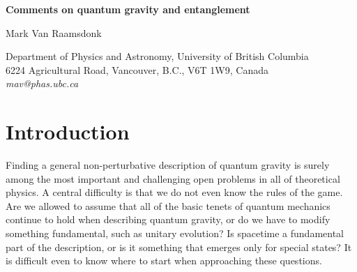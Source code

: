 \documentclass[12pt,epsf]{article}
\renewcommand{\(}{\left(}
\renewcommand{\)}{\right)}
\begin{document}
\begin{titlepage}
\hfill

\vspace*{20mm}
\begin{center}
{\Large \bf Comments on quantum gravity and entanglement}

\vspace*{15mm}
\vspace*{1mm}

Mark Van Raamsdonk

\vspace*{1cm}

{Department of Physics and Astronomy,
University of British Columbia\\
6224 Agricultural Road,
Vancouver, B.C., V6T 1W9, Canada\\
{\it mav@phas.ubc.ca}
}

\vspace*{1cm}
\end{center}

\begin{abstract}
In this note, we attempt to provide some insights into the structure of non-perturbative descriptions of quantum gravity using known examples of gauge-theory / gravity duality. We argue that in familiar examples, a quantum description of spacetime can be associated with a manifold-like structure in which particular patches of spacetime are associated with states or density matrices in specific quantum systems. We argue that quantum entanglement between microscopic degrees of freedom plays an essential role in the emergence of a dual spacetime from the nonperturbative degrees of freedom. In particular, in at least some cases, classically connected spacetimes may be understood as particular quantum superpositions of disconnected spacetimes.

\end{abstract}

\end{titlepage}

\vskip 1cm

\section{Introduction}

Finding a general non-perturbative description of quantum gravity is surely among the most important and challenging open problems in all of theoretical physics. A central difficulty is that we do not even know the rules of the game. Are we allowed to assume that all of the basic tenets of quantum mechanics continue to hold when describing quantum gravity, or do we have to modify something fundamental, such as unitary evolution? Is spacetime a fundamental part of the description, or is it something that emerges only for special states? It is difficult even to know where to start when approaching these questions.
\end{document}
